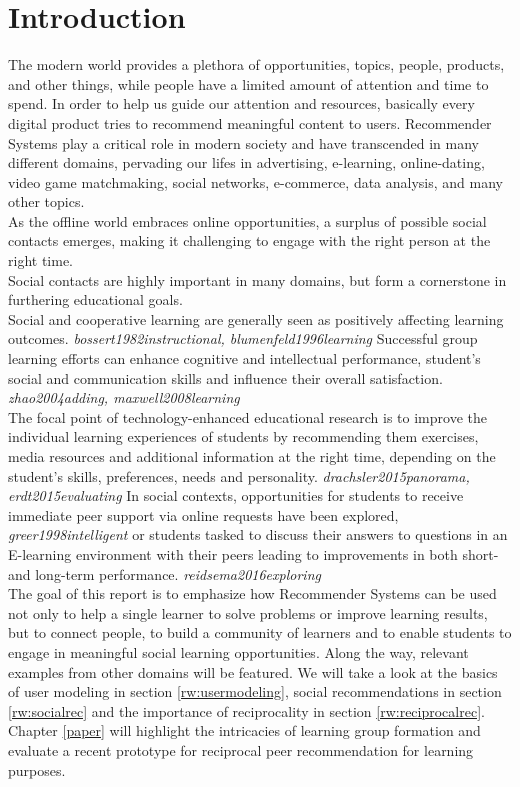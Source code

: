 \documentclass[nochapterpage,bigchapter,linedtoc,longdoc,colorback,accentcolor=tud3b,oneside]{tudreport}
\begin{document}
\chapter{Introduction}
The modern world provides a plethora of opportunities, topics, people, products, and other things, while people have a limited amount of attention and time to spend. In order to help us guide our attention and resources, basically every digital product tries to recommend meaningful content to users. Recommender Systems play a critical role in modern society and have transcended in many different domains, pervading our lifes in advertising, e-learning, online-dating, video game matchmaking, social networks, e-commerce, data analysis, and many other topics.\\
As the offline world embraces online opportunities, a surplus of possible social contacts emerges, making it challenging to engage with the right person at the right time.\\
Social contacts are highly important in many domains, but form a cornerstone in furthering educational goals.\\
Social and cooperative learning are generally seen as positively affecting learning outcomes. \textit{bossert1982instructional, blumenfeld1996learning} Successful group learning efforts can enhance cognitive and intellectual performance, student's social and communication skills and influence their overall satisfaction. \textit{zhao2004adding, maxwell2008learning}\\
The focal point of technology-enhanced educational research is to improve the individual learning experiences of students by recommending them exercises, media resources and additional information at the right time, depending on the student's skills, preferences, needs and personality. \textit{drachsler2015panorama, erdt2015evaluating} In social contexts, opportunities for students to receive immediate peer support via online requests have been explored, \textit{greer1998intelligent} or students tasked to discuss their answers to questions in an E-learning environment with their peers leading to improvements in both short- and long-term performance. \textit{reidsema2016exploring}\\
The goal of this report is to emphasize how Recommender Systems can be used not only to help a single learner to solve problems or improve learning results, but to connect people, to build a community of learners and to enable students to engage in meaningful social learning opportunities. Along the way, relevant examples from other domains will be featured. We will take a look at the basics of user modeling in section \ref{rw:usermodeling}, social recommendations in section \ref{rw:socialrec} and the importance of reciprocality in section \ref{rw:reciprocalrec}. Chapter \ref{paper} will highlight the intricacies of learning group formation and evaluate a recent prototype for reciprocal peer recommendation for learning purposes.\\
\end{document}
